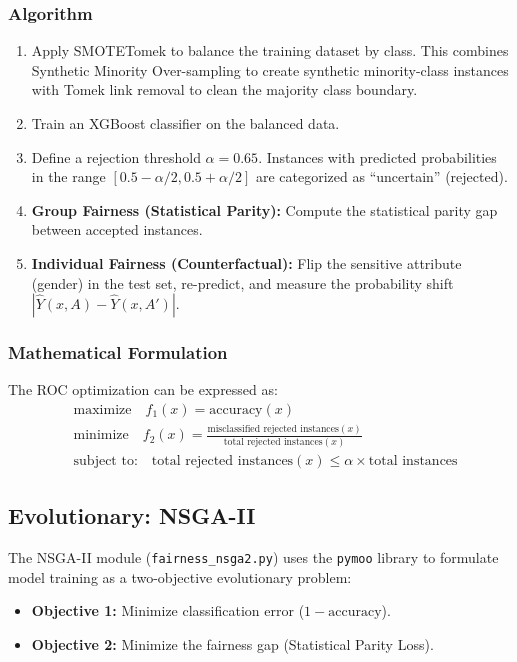 \documentclass[12pt,a4paper]{article}
\begin{document}
\subsubsection{Algorithm}
\begin{enumerate}
    \item Apply SMOTETomek to balance the training dataset by class. This combines Synthetic Minority Over-sampling to create synthetic minority-class instances with Tomek link removal to clean the majority class boundary.
    \item Train an XGBoost classifier on the balanced data.
    \item Define a rejection threshold $\alpha = 0.65$. Instances with predicted probabilities in the range $[0.5 - \alpha/2, 0.5 + \alpha/2]$ are categorized as ``uncertain'' (rejected).
    \item \textbf{Group Fairness (Statistical Parity):} Compute the statistical parity gap between accepted instances.
    \item \textbf{Individual Fairness (Counterfactual):} Flip the sensitive attribute (gender) in the test set, re-predict, and measure the probability shift $|\hat{Y}(x, A) - \hat{Y}(x, A')|$.
\end{enumerate}

\subsubsection{Mathematical Formulation}
The ROC optimization can be expressed as:
\begin{align}
    &\text{maximize} \quad f_1(x) = \text{accuracy}(x) \\
    &\text{minimize} \quad f_2(x) = \frac{\text{misclassified rejected instances}(x)}{\text{total rejected instances}(x)} \\
    &\text{subject to:} \quad \text{total rejected instances}(x) \leq \alpha \times \text{total instances}
\end{align}

\subsection{Evolutionary: NSGA-II}

The NSGA-II module (\texttt{fairness\_nsga2.py}) uses the \texttt{pymoo} library to formulate model training as a two-objective evolutionary problem:

\begin{itemize}
    \item \textbf{Objective 1:} Minimize classification error ($1 - \text{accuracy}$).
    \item \textbf{Objective 2:} Minimize the fairness gap (Statistical Parity Loss).
\end{itemize}
\end{document}
